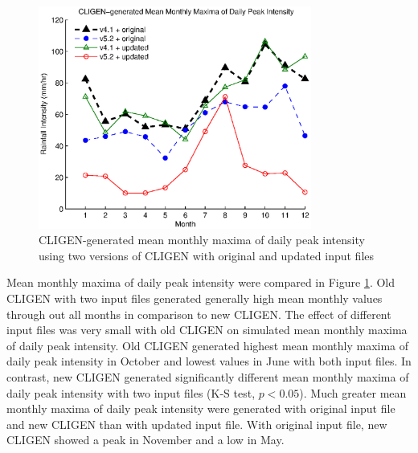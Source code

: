 \begin{figure}[htbp]
  \centering

\includegraphics[width=0.8\textwidth]{./img/cligen_monthly_max_int_by_month}
  \caption{CLIGEN-generated mean monthly maxima of daily peak intensity
using two versions of CLIGEN with original and updated input files}
  \label{fig:cligen_dr_monthly_max_int_by_month}
\end{figure}

Mean monthly maxima of daily peak intensity were compared in Figure
\ref{fig:cligen_dr_monthly_max_int_by_month}. Old CLIGEN with two input files
generated generally high mean monthly values through out all months in
comparison to new CLIGEN. The effect of different input files was very small
with old CLIGEN on simulated mean monthly maxima of daily peak intensity. Old
CLIGEN generated highest mean monthly maxima of daily peak intensity in October
and lowest values in June with both input files. In contrast, new CLIGEN
generated significantly different mean monthly maxima of daily peak intensity
with two input files (K-S test, $p<0.05$). Much greater mean monthly maxima of
daily peak intensity were generated with original input file and new CLIGEN than
with updated input file. With original input file, new CLIGEN showed a peak in
November and a low in May.

